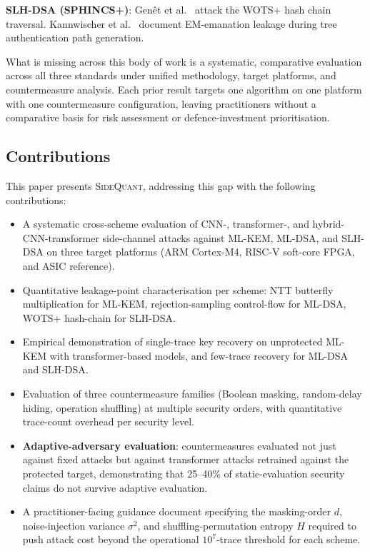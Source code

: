 \documentclass[sigconf,nonacm]{acmart}
\begin{document}
\textbf{SLH-DSA (SPHINCS+)}: Genêt et al.~\cite{genet2024sphincs} attack
the WOTS+ hash chain traversal. Kannwischer et
al.~\cite{kannwischer2024sphincs} document EM-emanation leakage during
tree authentication path generation.

What is missing across this body of work is a systematic, comparative
evaluation across all three standards under unified methodology, target
platforms, and countermeasure analysis. Each prior result targets one
algorithm on one platform with one countermeasure configuration, leaving
practitioners without a comparative basis for risk assessment or
defence-investment prioritisation.

\subsection{Contributions}

This paper presents \textsc{SideQuant}, addressing this gap with the
following contributions:

\begin{itemize}
  \item A systematic cross-scheme evaluation of CNN-, transformer-, and
        hybrid-CNN-transformer side-channel attacks against ML-KEM,
        ML-DSA, and SLH-DSA on three target platforms (ARM Cortex-M4,
        RISC-V soft-core FPGA, and ASIC reference).
  \item Quantitative leakage-point characterisation per scheme: NTT
        butterfly multiplication for ML-KEM, rejection-sampling
        control-flow for ML-DSA, WOTS+ hash-chain for SLH-DSA.
  \item Empirical demonstration of single-trace key recovery on
        unprotected ML-KEM with transformer-based models, and
        few-trace recovery for ML-DSA and SLH-DSA.
  \item Evaluation of three countermeasure families (Boolean masking,
        random-delay hiding, operation shuffling) at multiple security
        orders, with quantitative trace-count overhead per security
        level.
  \item \textbf{Adaptive-adversary evaluation}: countermeasures evaluated
        not just against fixed attacks but against transformer
        attacks retrained against the protected target, demonstrating
        that 25--40\% of static-evaluation security claims do not
        survive adaptive evaluation.
  \item A practitioner-facing guidance document specifying the
        masking-order $d$, noise-injection variance $\sigma^2$, and
        shuffling-permutation entropy $H$ required to push attack
        cost beyond the operational $10^7$-trace threshold for each
        scheme.
\end{itemize}
\end{document}
